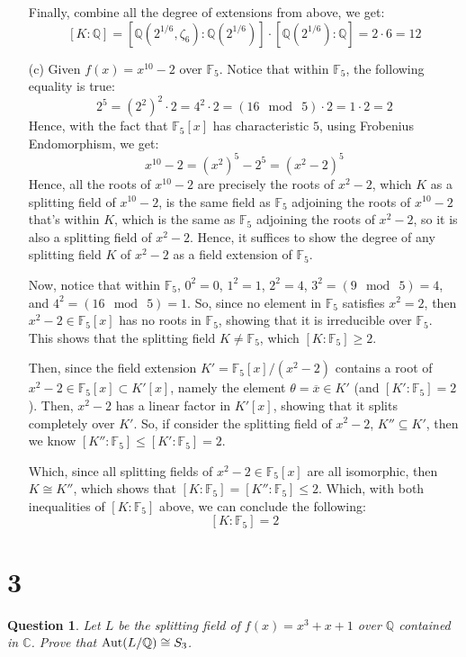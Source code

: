 \documentclass{article}
\newtheorem{question}{Question}
\begin{document}
\begin{itemize}
    Finally, combine all the degree of extensions from above, we get:
    $$[K:\mathbb{Q}] = [\mathbb{Q}(2^{1/6},\zeta_6):\mathbb{Q}(2^{1/6})]\cdot [\mathbb{Q}(2^{1/6}):\mathbb{Q}] = 2\cdot 6 = 12$$

    \hfil

    \item[(c)] Given $f(x)=x^{10}-2$ over $\mathbb{F}_5$. Notice that within $\mathbb{F}_5$, the following equality is true:
    $$2^5 = (2^2)^2\cdot 2=4^2\cdot 2 = (16\mod\ 5)\cdot 2 = 1\cdot 2 =  2$$
    Hence, with the fact that $\mathbb{F}_5[x]$ has characteristic $5$, using Frobenius Endomorphism, we get:
    $$x^{10}-2 = (x^2)^5 - 2^5 = (x^2-2)^5$$
    Hence, all the roots of $x^{10}-2$ are precisely the roots of $x^{2}-2$, which $K$ as a splitting field of $x^{10}-2$, is the same field as $\mathbb{F}_5$ adjoining the roots of $x^{10}-2$ that's within $K$, which is the same as $\mathbb{F}_5$ adjoining the roots of $x^2-2$, so it is also a splitting field of $x^2-2$. Hence, it suffices to show the degree of any splitting field $K$ of $x^2-2$ as a field extension of $\mathbb{F}_5$.

    Now, notice that within $\mathbb{F}_5$, $0^2=0$, $1^2=1$, $2^2=4$, $3^2=(9\mod\ 5) = 4$, and $4^2 = (16\mod\ 5) = 1$. So, since no element in $\mathbb{F}_5$ satisfies $x^2 = 2$, then $x^2-2\in\mathbb{F}_5[x]$ has no roots in $\mathbb{F}_5$, showing that it is irreducible over $\mathbb{F}_5$. This shows that the splitting field $K\neq \mathbb{F}_5$, which $[K:\mathbb{F}_5]\geq 2$.

    Then, since the field extension $K' = \mathbb{F}_5[x]/(x^2-2)$ contains a root of $x^2-2\in\mathbb{F}_5[x]\subset K'[x]$, namely the element $\theta=\overline{x}\in K'$ (and  $[K':\mathbb{F}_5]=2$). Then, $x^2-2$ has a linear factor in $K'[x]$, showing that it splits completely over $K'$. So, if consider the splitting field of $x^2-2$, $K''\subseteq K'$, then we know $[K'':\mathbb{F}_5]\leq [K':\mathbb{F}_5] = 2$.

    Which, since all splitting fields of $x^2-2\in\mathbb{F}_5[x]$ are all isomorphic, then $K\cong K''$, which shows that $[K:\mathbb{F}_5] = [K'':\mathbb{F}_5]\leq 2$. Which, with both inequalities of $[K:\mathbb{F}_5]$ above, we can conclude the following:
    $$[K:\mathbb{F}_5] = 2$$
\end{itemize}

\break

\section*{3}
\begin{myBox}[]{}
    \begin{question}
        Let $L$ be the splitting field of $f(x)=x^3+x+1$ over $\mathbb{Q}$ contained in $\mathbb{C}$. Prove that $\textmd{Aut}(L/\mathbb{Q})\cong S_3$.
    \end{question}
\end{myBox}
\end{document}
